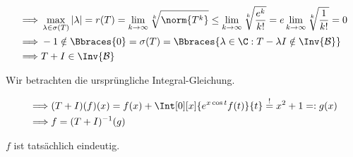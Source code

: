 \begin{solution}
\begin{align*}
  \implies &
  \max_{\lambda \in \sigma(T)} |\lambda|
  =
  r(T)
  =
  \lim_{k \to \infty}
  \sqrt[k]{\norm{T^k}}
  \leq
  \lim_{k \to \infty}
  \sqrt[k]{\frac{e^k}{k!}}
  =
  e
  \lim_{k \to \infty}
  \sqrt[k]{\frac{1}{k!}}
  =
  0 \\
  \implies &
  -1
  \notin
  \Bbraces{0}
  =
  \sigma(T)
  =
  \Bbraces
  {
    \lambda \in \C:
    T - \lambda I \notin \Inv{\mathcal{B}}
  } \\
  \implies &
  T + I \in \Inv{\mathcal{B}}
\end{align*}

Wir betrachten die ursprüngliche Integral-Gleichung.

\begin{align*}
  \implies &
  (T + I)(f)(x)
  =
  f(x) + \Int[0][x]{e^{x \cos{t}} f(t)}{t}
  \stackrel{!}{=}
  x^2 + 1
  =:
  g(x) \\
  \implies &
  f = (T + I)^{-1}(g)
\end{align*}

$f$ ist tatsächlich eindeutig.

\end{solution}
